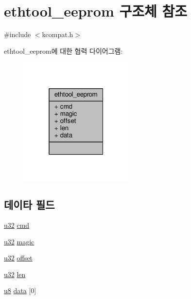 \hypertarget{structethtool__eeprom}{}\section{ethtool\+\_\+eeprom 구조체 참조}
\label{structethtool__eeprom}


{\ttfamily \#include $<$kcompat.\+h$>$}



ethtool\+\_\+eeprom에 대한 협력 다이어그램\+:
\nopagebreak
\begin{figure}[H]
\begin{center}
\leavevmode
\includegraphics[width=163pt]{structethtool__eeprom__coll__graph}
\end{center}
\end{figure}
\subsection*{데이타 필드}
\begin{DoxyCompactItemize}
\item 
\hyperlink{lib_2igb_2e1000__osdep_8h_a64e91c10a0d8fb627e92932050284264}{u32} \hyperlink{structethtool__eeprom_a62fe2a1dbf17d5a8561a5a7f5a97a9ba}{cmd}
\item 
\hyperlink{lib_2igb_2e1000__osdep_8h_a64e91c10a0d8fb627e92932050284264}{u32} \hyperlink{structethtool__eeprom_a1c2f2992893a71ac0ee3f43477000176}{magic}
\item 
\hyperlink{lib_2igb_2e1000__osdep_8h_a64e91c10a0d8fb627e92932050284264}{u32} \hyperlink{structethtool__eeprom_a4ba37e6b40e12ce1d1e5dbee0323069d}{offset}
\item 
\hyperlink{lib_2igb_2e1000__osdep_8h_a64e91c10a0d8fb627e92932050284264}{u32} \hyperlink{structethtool__eeprom_a4105737bcbe35c1fd69996a085d8231a}{len}
\item 
\hyperlink{lib_2igb_2e1000__osdep_8h_a8baca7e76da9e0e11ce3a275dd19130c}{u8} \hyperlink{structethtool__eeprom_a2873fa0c210cc63894b6cbb14e1a1330}{data} \mbox{[}0\mbox{]}
\end{DoxyCompactItemize}


